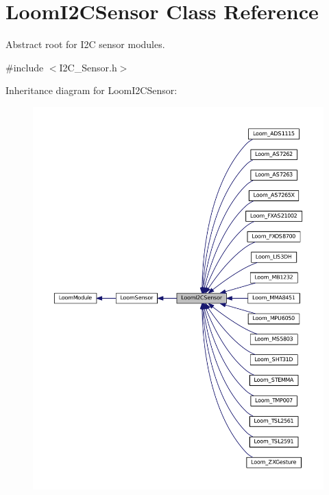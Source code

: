\hypertarget{class_loom_i2_c_sensor}{}\section{Loom\+I2\+C\+Sensor Class Reference}
\label{class_loom_i2_c_sensor}


Abstract root for I2C sensor modules.  




{\ttfamily \#include $<$I2\+C\+\_\+\+Sensor.\+h$>$}



Inheritance diagram for Loom\+I2\+C\+Sensor\+:\nopagebreak
\begin{figure}[H]
\begin{center}
\leavevmode
\includegraphics[width=350pt]{class_loom_i2_c_sensor__inherit__graph}
\end{center}
\end{figure}
